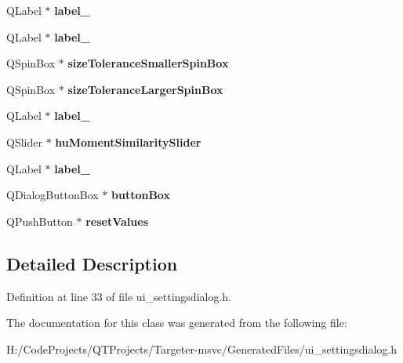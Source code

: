 \begin{DoxyCompactItemize}
Q\+Label $\ast$ {\bfseries label\+\_}
\item 
\mbox{\label{class_ui___settings_dialog_a089852c945a6a5aaee3be4557041493f}} 
Q\+Label $\ast$ {\bfseries label\+\_}
\item 
\mbox{\label{class_ui___settings_dialog_a60c51404b18ff171c77850c7bfd97f18}} 
Q\+Spin\+Box $\ast$ {\bfseries size\+Tolerance\+Smaller\+Spin\+Box}
\item 
\mbox{\label{class_ui___settings_dialog_a40723cd17eff39c345a62944f35f094b}} 
Q\+Spin\+Box $\ast$ {\bfseries size\+Tolerance\+Larger\+Spin\+Box}
\item 
\mbox{\label{class_ui___settings_dialog_af7f6d3aac8c3e1446088298e58623cdb}} 
Q\+Label $\ast$ {\bfseries label\+\_}
\item 
\mbox{\label{class_ui___settings_dialog_abb4475dfeb80f4375b9e95bd48738852}} 
Q\+Slider $\ast$ {\bfseries hu\+Moment\+Similarity\+Slider}
\item 
\mbox{\label{class_ui___settings_dialog_a83d928990bb76fa72ae251ff3424643e}} 
Q\+Label $\ast$ {\bfseries label\+\_}
\item 
\mbox{\label{class_ui___settings_dialog_ad2dd31dc9ceee549199e20bf03177f1e}} 
Q\+Dialog\+Button\+Box $\ast$ {\bfseries button\+Box}
\item 
\mbox{\label{class_ui___settings_dialog_a2d6c1138d7a4f9586bc19be7d2547e09}} 
Q\+Push\+Button $\ast$ {\bfseries reset\+Values}
\end{DoxyCompactItemize}


\subsection{Detailed Description}


Definition at line 33 of file ui\+\_\+settingsdialog.\+h.



The documentation for this class was generated from the following file\+:\begin{DoxyCompactItemize}
\item 
H\+:/\+Code\+Projects/\+Q\+T\+Projects/\+Targeter-\/msvc/\+Generated\+Files/ui\+\_\+settingsdialog.\+h\end{DoxyCompactItemize}
